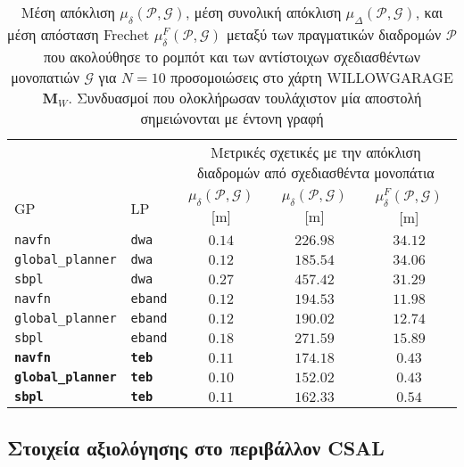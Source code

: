 \begin{table}[h]\hspace{-1cm}
\renewcommand{\arraystretch}{1.3}
\begin{tabular}{llccc}
  & & \multicolumn{3}{c}{Μετρικές σχετικές με την απόκλιση διαδρομών από σχεδιασθέντα μονοπάτια} \\
  \cline{3-5}
  GP & LP & $\mu_{\delta}(\bm{\mathcal{P}},\bm{\mathcal{G}})$ [m] & $\mu_{\delta}(\bm{\mathcal{P}},\bm{\mathcal{G}})$ [m] & $\mu_{\delta}^F(\bm{\mathcal{P}},\bm{\mathcal{G}})$ [m] \\ \toprule
  \texttt{navfn} & \texttt{dwa} & $0.14$ & $226.98$ & $34.12$ \\
  \texttt{global\_planner} & \texttt{dwa} & $0.12$ & $185.54$ & $34.06$ \\
  \texttt{sbpl} & \texttt{dwa} & $0.27$ & $457.42$ & $31.29$ \\
  \texttt{navfn} & \texttt{eband} & $0.12$ & $194.53$ & $11.98$ \\
  \texttt{global\_planner} & \texttt{eband} & $0.12$ & $190.02$ & $12.74$ \\
  \texttt{sbpl} & \texttt{eband} & $0.18$ & $271.59$ & $15.89$ \\
  \textbf{\texttt{navfn}} & \textbf{\texttt{teb}} & $\bm{0.11}$ & $\bm{174.18}$ & $\bm{0.43}$ \\
  \textbf{\texttt{global\_planner}} & \textbf{\texttt{teb}} & $\bm{0.10}$ & $\bm{152.02}$ & $\bm{0.43}$ \\
  \textbf{\texttt{sbpl}} & \textbf{\texttt{teb}} & $\bm{0.11}$ & $\bm{162.33}$ & $\bm{0.54}$ \\ \bottomrule
\end{tabular}
\caption{\small Μέση απόκλιση $\mu_{\delta}(\bm{\mathcal{P}},\bm{\mathcal{G}})$,
         μέση συνολική απόκλιση
         $\mu_{\Delta}(\bm{\mathcal{P}},\bm{\mathcal{G}})$, και μέση απόσταση
         Frechet $\mu_{\delta}^F(\bm{\mathcal{P}},\bm{\mathcal{G}})$ μεταξύ των
         πραγματικών διαδρομών $\bm{\mathcal{P}}$ που ακολούθησε το ρομπότ και
         των αντίστοιχων σχεδιασθέντων μονοπατιών $\bm{\mathcal{G}}$ για $N=10$
         προσομοιώσεις στο χάρτη WILLOWGARAGE $\bm{M}_W$. Συνδυασμοί που
         ολοκλήρωσαν τουλάχιστον μία αποστολή σημειώνονται με έντονη γραφή}
\label{tbl:info_deviation_from_global_plan_willowgarage}
\end{table}



\subsection{Στοιχεία αξιολόγησης στο περιβάλλον CSAL}
\label{appendix:evaluation_csal}

